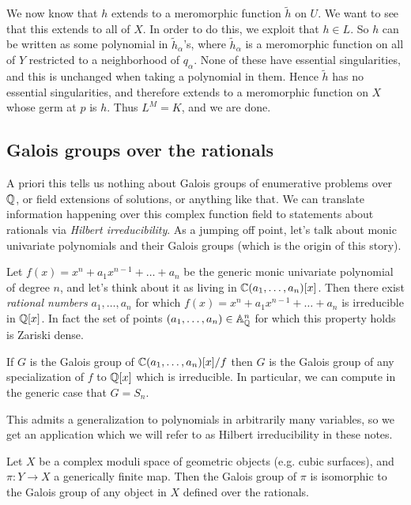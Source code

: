 \documentclass[11pt]{amsart}
\let\til\widetilde
\begin{document}
We now know that $h$ extends to a meromorphic function $\til{h}$ on $U$. We want to see that this extends to all of $X$. In order to do this, we exploit that $h \in L$. So $h$ can be written as some polynomial in $\til{h}_\alpha$'s, where $\til{h}_\alpha$ is a meromorphic function on all of $Y$ restricted to a neighborhood of $q_\alpha$. None of these have essential singularities, and this is unchanged when taking a polynomial in them. Hence $\til{h}$ has no essential singularities, and therefore extends to a meromorphic function on $X$ whose germ at $p$ is $h$. Thus $L^M = K$, and we are done.

\subsection{Galois groups over the rationals}

A priori this tells us nothing about Galois groups of enumerative problems over $\mathbb{Q}$, or field extensions of solutions, or anything like that. We can translate information happening over this complex function field to statements about rationals via \textit{Hilbert irreducibility}. As a jumping off point, let's talk about monic univariate polynomials and their Galois groups (which is the origin of this story).

\begin{example} Let $f(x) = x^n + a_1 x^{n-1} + \ldots + a_n$ be the generic monic univariate polynomial of degree $n$, and let's think about it as living in $\mathbb{C}(a_1, \ldots, a_n)[x]$. Then there exist \textit{rational numbers} $a_1, \ldots, a_n$ for which $f(x) = x^n + a_1 x^{n-1} + \ldots + a_n$ is irreducible in $\mathbb{Q}[x]$. In fact the set of points $(a_1, \ldots, a_n) \in \mathbb{A}^n_{\mathbb{Q}}$ for which this property holds is Zariski dense.
\end{example}

\begin{corollary} If $G$ is the Galois group of $\mathbb{C}(a_1, \ldots, a_n)[x] / f$ then $G$ is the Galois group of any specialization of $f$ to $\mathbb{Q}[x]$ which is irreducible. In particular, we can compute in the generic case that $G = S_n$.
\end{corollary}

This admits a generalization to polynomials in arbitrarily many variables, so we get an application which we will refer to as Hilbert irreducibility in these notes.

\begin{slogan} Let $X$ be a complex moduli space of geometric objects (e.g. cubic surfaces), and $\pi \colon Y \to X$ a generically finite map. Then the Galois group of $\pi$ is isomorphic to the Galois group of any object in $X$ defined over the rationals.
\end{slogan}
\end{document}
